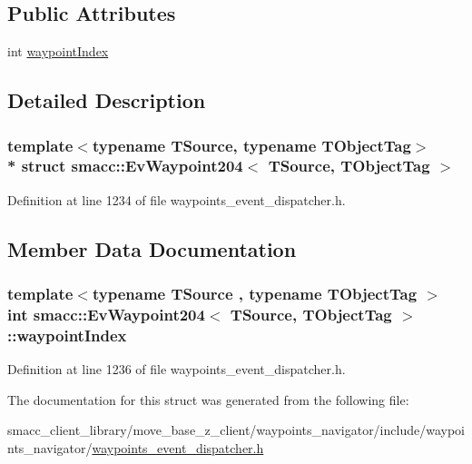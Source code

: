 \subsection*{Public Attributes}
\begin{DoxyCompactItemize}
\item 
int \hyperlink{structsmacc_1_1EvWaypoint204_a2884361129fca2eb2099a864706ebbc9}{waypoint\+Index}
\end{DoxyCompactItemize}


\subsection{Detailed Description}
\subsubsection*{template$<$typename T\+Source, typename T\+Object\+Tag$>$\\*
struct smacc\+::\+Ev\+Waypoint204$<$ T\+Source, T\+Object\+Tag $>$}



Definition at line 1234 of file waypoints\+\_\+event\+\_\+dispatcher.\+h.



\subsection{Member Data Documentation}
\subsubsection[{\texorpdfstring{waypoint\+Index}{waypointIndex}}]{\setlength{\rightskip}{0pt plus 5cm}template$<$typename T\+Source , typename T\+Object\+Tag $>$ int {\bf smacc\+::\+Ev\+Waypoint204}$<$ T\+Source, T\+Object\+Tag $>$\+::waypoint\+Index}\hypertarget{structsmacc_1_1EvWaypoint204_a2884361129fca2eb2099a864706ebbc9}{}\label{structsmacc_1_1EvWaypoint204_a2884361129fca2eb2099a864706ebbc9}


Definition at line 1236 of file waypoints\+\_\+event\+\_\+dispatcher.\+h.



The documentation for this struct was generated from the following file\+:\begin{DoxyCompactItemize}
\item 
smacc\+\_\+client\+\_\+library/move\+\_\+base\+\_\+z\+\_\+client/waypoints\+\_\+navigator/include/waypoints\+\_\+navigator/\hyperlink{waypoints__event__dispatcher_8h}{waypoints\+\_\+event\+\_\+dispatcher.\+h}\end{DoxyCompactItemize}
